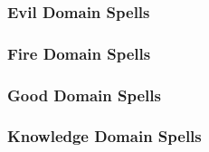 \begin{spelllist}
    \SLearthenblade[1]
    \SLearthspike[2]
    \SLearthspull[3]
    \SLearthglide[4]
    \SLtransmutefleshandstone[5]
    \SLfissure[6]
    \SLgolemheart[7]
    \SLimprisonment[8]
    \SLearthquake[9]
\end{spelllist}

\subsubsection{Evil Domain Spells}

\begin{spelllist}
    \SLprotectionfromalignment[1]
    \SLcurseofbloodandbone[2]
    \SLunholyblight[3]
    \SLenervation[4]
    \SLblasphemy[5]
    \SLharm[6]
    \SLstriptheflesh[7]
    \SLavatarofsuffering[8]
    \SLunholyavatar[9]
\end{spelllist}

\subsubsection{Fire Domain Spells}

\begin{spelllist}
    \SLburninghands[1]
    \SLwalloffire[2]
    \SLfireball[3]
    \SLfireshield[4]
    \SLflamestrike[5]
    \SLinferno[6]
    \SLimmolation[7]
    \SLfirestorm[8]
    \SLmeteorswarm[9]
\end{spelllist}

\subsubsection{Good Domain Spells}

\begin{spelllist}
    \SLprotectionfromalignment[1]
    \SLaid[2]
    \SLholysmite[3]
    \SLavatarofhealing[4]
    \SLholyword[5]
    \SLheal[6]
    \SLdivinejudgment[7]
    \SLmartyrsgift[8]
    \SLholyavatar[9]
\end{spelllist}

\subsubsection{Knowledge Domain Spells}

\begin{spelllist}
    \SLboonofperception[1]
    \SLboonofknowledge[2]
    \SLboonofmastery[3]
    \SLboonofmanyeyes[4]
    \SLboonofprecision[5]
    \SLtrueseeing[6]
    \SLscrybolt[7]
    \SLthirdeye[8]
    \SLrevelation[9]
\end{spelllist}

